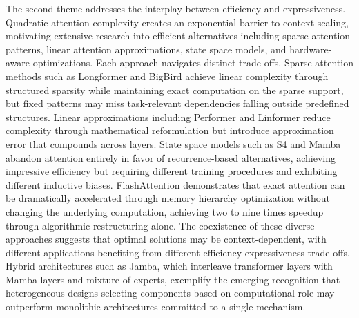\documentclass[11pt,letterpaper]{article}
\begin{document}
The second theme addresses the interplay between efficiency and expressiveness. Quadratic attention complexity creates an exponential barrier to context scaling, motivating extensive research into efficient alternatives including sparse attention patterns, linear attention approximations, state space models, and hardware-aware optimizations. Each approach navigates distinct trade-offs. Sparse attention methods such as Longformer and BigBird achieve linear complexity through structured sparsity while maintaining exact computation on the sparse support, but fixed patterns may miss task-relevant dependencies falling outside predefined structures. Linear approximations including Performer and Linformer reduce complexity through mathematical reformulation but introduce approximation error that compounds across layers. State space models such as S4 and Mamba abandon attention entirely in favor of recurrence-based alternatives, achieving impressive efficiency but requiring different training procedures and exhibiting different inductive biases. FlashAttention demonstrates that exact attention can be dramatically accelerated through memory hierarchy optimization without changing the underlying computation, achieving two to nine times speedup through algorithmic restructuring alone. The coexistence of these diverse approaches suggests that optimal solutions may be context-dependent, with different applications benefiting from different efficiency-expressiveness trade-offs. Hybrid architectures such as Jamba, which interleave transformer layers with Mamba layers and mixture-of-experts, exemplify the emerging recognition that heterogeneous designs selecting components based on computational role may outperform monolithic architectures committed to a single mechanism.
\end{document}
